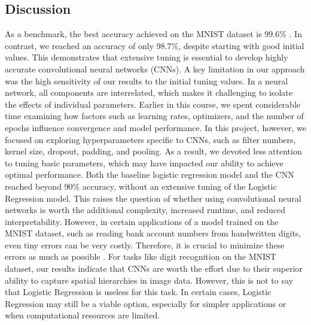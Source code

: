 \newpage
\subsection{Discussion}
As a benchmark, the best accuracy achieved on the MNIST dataset is 99.6\% \cite{simard2003mnist}. In contrast, we reached an accuracy of only 98.7\%, despite starting with good initial values. This demonstrates that extensive tuning is essential to develop highly accurate convolutional neural networks (CNNs). A key limitation in our approach was the high sensitivity of our results to the initial tuning values. In a neural network, all components are interrelated, which makes it challenging to isolate the effects of individual parameters.
\newline
\newline
Earlier in this course, we spent considerable time examining how factors such as learning rates, optimizers, and the number of epochs influence convergence and model performance. In this project, however, we focused on exploring hyperparameters specific to CNNs, such as filter numbers, kernel size, dropout, padding, and pooling. As a result, we devoted less attention to tuning basic parameters, which may have impacted our ability to achieve optimal performance.
\newline
\newline
Both the baseline logistic regression model and the CNN reached beyond 90\% accuracy, without an extensive tuning of the Logistic Regression model. This raises the question of whether using convolutional neural networks is worth the additional complexity, increased runtime, and reduced interpretability. However, in certain applications of a model trained on the MNIST dataset, such as reading bank account numbers from handwritten digits, even tiny errors can be very costly. Therefore, it is crucial to minimize these errors as much as possible \cite{raschka2022machine}. 
\newline
\newline
For tasks like digit recognition on the MNIST dataset, our results indicate that CNNs are worth the effort due to their superior ability to capture spatial hierarchies in image data. However, this is not to say that Logistic Regression is useless for this task. In certain cases, Logistic Regression may still be a viable option, especially for simpler applications or when computational resources are limited. 
